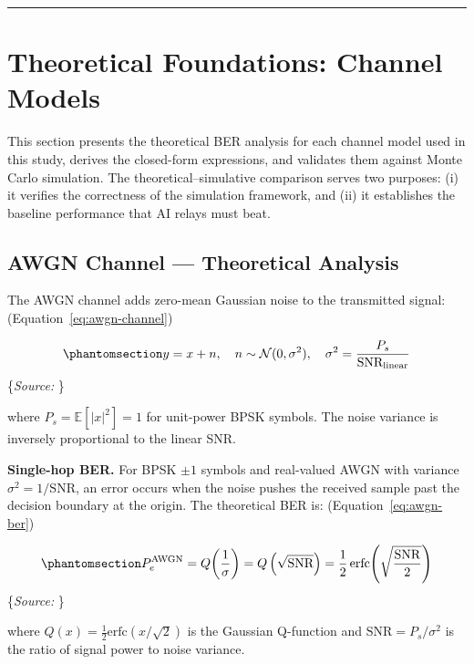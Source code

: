 \documentclass[
  english,
  12pt,
  12pt,
  a4paper,
  oneside]{report}
\begin{document}
\begin{center}\rule{0.5\linewidth}{0.5pt}\end{center}

\section{Theoretical Foundations: Channel Models}\label{sec:theoretical-foundations-channel-models}

This section presents the theoretical BER analysis for each channel model used in this study, derives the closed-form expressions, and validates them against Monte Carlo simulation. The theoretical--simulative comparison serves two purposes: (i) it verifies the correctness of the simulation framework, and (ii) it establishes the baseline performance that AI relays must beat.

\subsection{AWGN Channel --- Theoretical Analysis}\label{sec:awgn-channel-theoretical-analysis}

The AWGN channel adds zero-mean Gaussian noise to the transmitted signal: (Equation~\ref{eq:awgn-channel})

\begin{equation}\protect\phantomsection\label{eq:awgn-channel}{y = x + n, \quad n \sim \mathcal{N}(0, \sigma^2), \quad \sigma^2 = \frac{P_s}{\text{SNR}_{\text{linear}}}
}\end{equation} \footnotesize\{\textit{Source: \1}\}\normalsize

where \(P_s = \mathbb{E}[|x|^2] = 1\) for unit-power BPSK symbols. The noise variance is inversely proportional to the linear SNR.

\textbf{Single-hop BER.} For BPSK \(\pm 1\) symbols and real-valued AWGN with variance \(\sigma^2 = 1/\text{SNR}\), an error occurs when the noise pushes the received sample past the decision boundary at the origin. The theoretical BER is: (Equation~\ref{eq:awgn-ber})

\begin{equation}\protect\phantomsection\label{eq:awgn-ber}{P_e^{\text{AWGN}} = Q\!\left(\frac{1}{\sigma}\right) = Q\left(\sqrt{\text{SNR}}\right) = \frac{1}{2}\,\text{erfc}\!\left(\sqrt{\frac{\text{SNR}}{2}}\right)
}\end{equation} \footnotesize\{\textit{Source: \1}\}\normalsize

where \(Q(x) = \frac{1}{2}\text{erfc}(x/\sqrt{2})\) is the Gaussian Q-function and \(\text{SNR} = P_s / \sigma^2\) is the ratio of signal power to noise variance.
\end{document}
